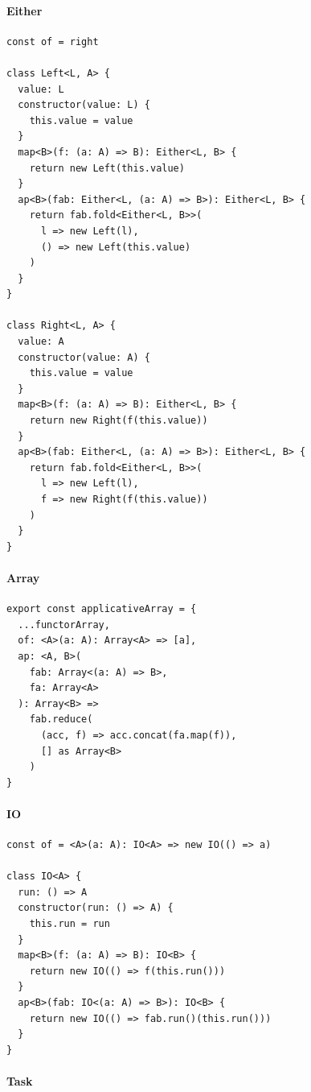 \documentclass[12pt]{article}
\begin{document}
\paragraph{Either}

\begin{verbatim}
const of = right

class Left<L, A> {
  value: L
  constructor(value: L) {
    this.value = value
  }
  map<B>(f: (a: A) => B): Either<L, B> {
    return new Left(this.value)
  }
  ap<B>(fab: Either<L, (a: A) => B>): Either<L, B> {
    return fab.fold<Either<L, B>>(
      l => new Left(l),
      () => new Left(this.value)
    )
  }
}

class Right<L, A> {
  value: A
  constructor(value: A) {
    this.value = value
  }
  map<B>(f: (a: A) => B): Either<L, B> {
    return new Right(f(this.value))
  }
  ap<B>(fab: Either<L, (a: A) => B>): Either<L, B> {
    return fab.fold<Either<L, B>>(
      l => new Left(l),
      f => new Right(f(this.value))
    )
  }
}
\end{verbatim}

\paragraph{Array}

\begin{verbatim}
export const applicativeArray = {
  ...functorArray,
  of: <A>(a: A): Array<A> => [a],
  ap: <A, B>(
    fab: Array<(a: A) => B>,
    fa: Array<A>
  ): Array<B> =>
    fab.reduce(
      (acc, f) => acc.concat(fa.map(f)),
      [] as Array<B>
    )
}
\end{verbatim}

\paragraph{IO}

\begin{verbatim}
const of = <A>(a: A): IO<A> => new IO(() => a)

class IO<A> {
  run: () => A
  constructor(run: () => A) {
    this.run = run
  }
  map<B>(f: (a: A) => B): IO<B> {
    return new IO(() => f(this.run()))
  }
  ap<B>(fab: IO<(a: A) => B>): IO<B> {
    return new IO(() => fab.run()(this.run()))
  }
}
\end{verbatim}

\paragraph{Task}
\end{document}
